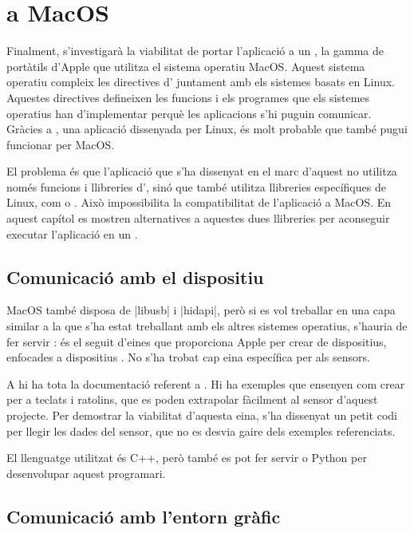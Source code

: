 \section{ a MacOS}

Finalment, s'investigarà la viabilitat de portar l'aplicació a un ,
la gamma de portàtils d'Apple que utilitza el sistema operatiu MacOS. Aquest
sistema operatiu compleix les directives d' juntament amb els
sistemes basats en Linux. Aquestes directives defineixen les funcions i els
programes que els sistemes operatius han d'implementar perquè les aplicacions
s'hi puguin comunicar. Gràcies a , una aplicació dissenyada per Linux,
és molt probable que també pugui funcionar per MacOS.

El problema és que l'aplicació que s'ha dissenyat en el marc d'aquest 
no utilitza només funcions i llibreries d', sinó que també utilitza
llibreries específiques de Linux, com  o . Això
impossibilita la compatibilitat de l'aplicació a MacOS. En aquest capítol es
mostren alternatives a aquestes dues llibreries per aconseguir executar
l'aplicació en un .

\subsection{Comunicació amb el dispositiu}

MacOS també disposa de \ord|libusb| i \ord|hidapi|, però si es vol treballar en
una capa similar a la que s'ha estat treballant amb els altres sistemes
operatius, s'hauria de fer servir : és el seguit
d'eines que proporciona Apple per crear  de dispositius,
enfocades a dispositius . No s'ha trobat cap eina específica per als
sensors.

A \cite{HidDriverKit} hi ha tota la documentació referent a .
Hi ha exemples que ensenyen com crear  per a teclats i ratolins,
que es poden extrapolar fàcilment al sensor d'aquest projecte. Per
demostrar la viabilitat d'aquesta eina, s'ha dissenyat un petit codi per
llegir les dades del sensor, que no es desvia gaire dels exemples referenciats.

El llenguatge utilitzat és C++, però també es pot fer servir  o
Python per desenvolupar aquest programari.

\subsection{Comunicació amb l'entorn gràfic}

